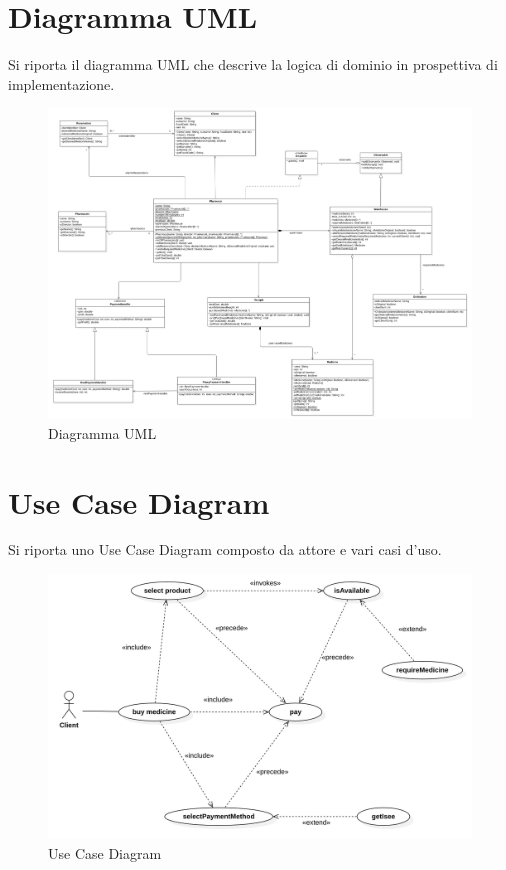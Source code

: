 \documentclass[a4paper, 10pt]{report}
\begin{document}
\section{Diagramma UML}
Si riporta il diagramma UML che descrive la logica di dominio in prospettiva di implementazione.
\begin{figure}[h]
\centering
\includegraphics[scale=0.4,angle=0]{PharmacyUML.png}
\caption{Diagramma UML}
\end{figure}
\section{Use Case Diagram}
Si riporta uno Use Case Diagram composto da attore e vari casi d'uso.
\begin{figure}[h]
\centering
\includegraphics[scale=0.5,angle=0]{PharmacyUCD.png}
\caption{Use Case Diagram}
\end{figure}
\end{document}
